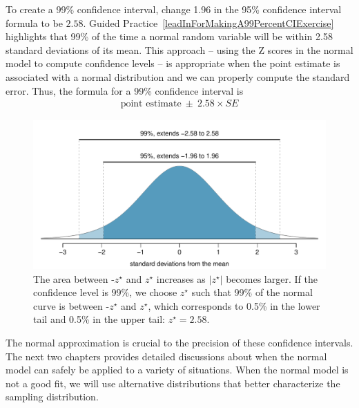 To create a 99\% confidence interval, change 1.96 in the 95\% confidence interval formula to be $2.58$. Guided Practice~\ref{leadInForMakingA99PercentCIExercise} highlights that 99\% of the time a normal random variable will be within 2.58 standard deviations of its mean. This approach -- using the Z scores in the normal model to compute confidence levels -- is appropriate when the point estimate is associated with a normal distribution and we can properly compute the standard error. Thus, the formula for a 99\% confidence interval is
\begin{eqnarray}
\text{point estimate}\ \pm\ 2.58\times SE
\label{99PercCIForMean}
\label{99PercCIForNormalPointEstimate}
\end{eqnarray}

\begin{figure}[ht]
\centering
\includegraphics[width=\textwidth]{02/figures/choosingZForCI/choosingZForCI}
\caption{The area between -$z^{\star}$ and $z^{\star}$ increases as $|z^{\star}|$ becomes larger. If the confidence level is 99\%, we choose $z^{\star}$ such that 99\% of the normal curve is between -$z^{\star}$ and $z^{\star}$, which corresponds to 0.5\% in the lower tail and 0.5\% in the upper tail: $z^{\star}=2.58$.}
\label{choosingZForCI}
\end{figure}

The normal approximation is crucial to the precision of these confidence intervals. The next two chapters provides detailed discussions about when the normal model can safely be applied to a variety of situations. When the normal model is not a good fit, we will use alternative distributions that better characterize the sampling distribution.

\textA{\pagebreak}


